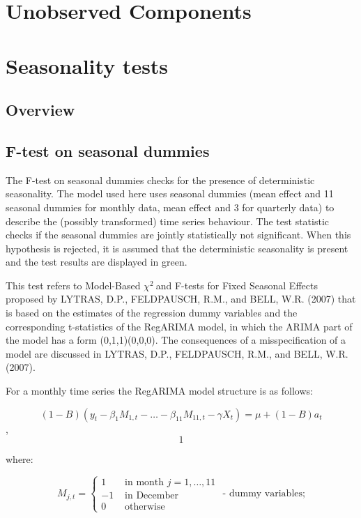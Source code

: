 \documentclass[
]{book}
\begin{document}
\hypertarget{unobserved-components}{%
\section{Unobserved Components}\label{unobserved-components}}

\hypertarget{seasonality-tests}{%
\section{Seasonality tests}\label{seasonality-tests}}

\hypertarget{overview-1}{%
\subsection{Overview}\label{overview-1}}

\hypertarget{f-test-on-seasonal-dummies}{%
\subsection{F-test on seasonal dummies}\label{f-test-on-seasonal-dummies}}

The F-test on seasonal dummies checks for the presence of deterministic
seasonality. The model used here uses seasonal dummies (mean effect and
11 seasonal dummies for monthly data, mean effect and 3 for quarterly
data) to describe the (possibly transformed) time series behaviour. The
test statistic checks if the seasonal dummies are jointly statistically
not significant. When this hypothesis is rejected, it is assumed that
the deterministic seasonality is present and the test results are
displayed in green.

This test refers to Model-Based \(\chi^{2}\ \)and F-tests for Fixed
Seasonal Effects proposed by LYTRAS, D.P., FELDPAUSCH, R.M., and BELL,
W.R. (2007) that is based on the estimates of the regression dummy
variables and the corresponding t-statistics of the RegARIMA model, in
which the ARIMA part of the model has a form (0,1,1)(0,0,0). The
consequences of a misspecification of a model are discussed in LYTRAS,
D.P., FELDPAUSCH, R.M., and BELL, W.R. (2007).

For a monthly time series the RegARIMA model structure is as follows:

\[\left( 1 - B \right)\left( y_{t} - \beta_{1}M_{1,t} - \ldots - \beta_{11}M_{11,t} - \gamma X_{t} \right) = \mu + (1 - B)a_{t}
\], \[1\]

where:

\[
M_{j,t} =
\begin{cases}
1 & \text{ in month } j = 1, \ldots, 11 \\
- 1 & \text{ in December}\\
0 & \text{ otherwise}
\end{cases} \text{ - dummy variables;}
\]
\end{document}
